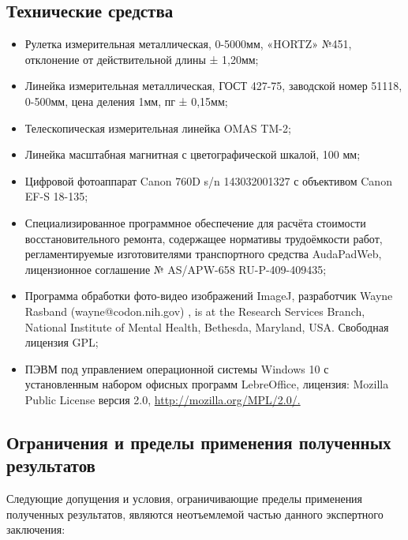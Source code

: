 \subsection{Технические средства}

\begin{itemize}
\item  Рулетка измерительная металлическая, 0-5000мм, «HORTZ» №451, отклонение от действительной длины ± 1,20мм;
\item  Линейка измерительная металлическая, ГОСТ 427-75, заводской номер 51118, 0-500мм, цена деления 1мм, пг ± 0,15мм;
\item Телескопическая измерительная линейка OMAS TM-2;
\item  Линейка масштабная магнитная с цветографической шкалой, 100 мм;
\item  Цифровой фотоаппарат  Canon 760D s/n 143032001327  с объективом Canon EF-S 18-135;
\item  Специализированное программное обеспечение для расчёта стоимости  восстановительного ремонта, содержащее нормативы трудоёмкости работ, регламентируемые изготовителями транспортного средства     AudaPadWeb, лицензионное соглашение № AS/APW-658  RU-P-409-409435;
\item  Программа обработки фото-видео изображений ImageJ, разработчик  Wayne Rasband (wayne@codon.nih.gov) , is at the Research Services Branch, National Institute of Mental Health, Bethesda, Maryland, USA. Свободная лицензия GPL;
\item  ПЭВМ под управлением операционной системы Windows 10 с установленным набором офисных программ LebreOffice, лицензия: Mozilla Public License версия 2.0, \url{http://mozilla.org/MPL/2.0/.}
\end{itemize}
\subsection{Ограничения и пределы применения полученных результатов}

Следующие допущения и условия, ограничивающие пределы применения полученных результатов, являются неотъемлемой частью данного экспертного заключения:
      
